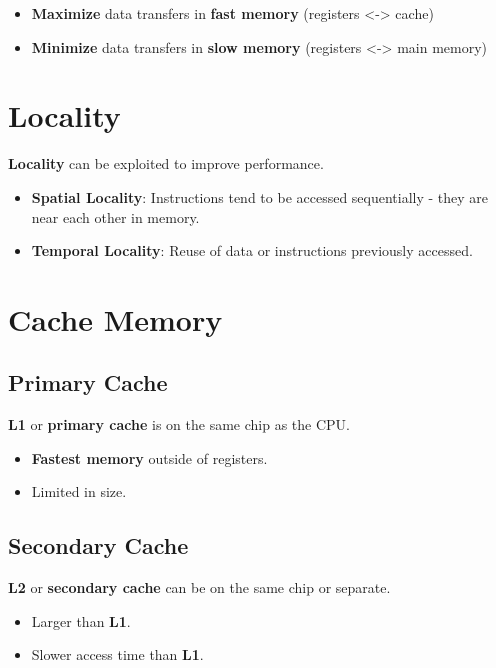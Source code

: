 \documentclass[12pt, letterpaper]{article}
\begin{document}
\begin{itemize}
  \item \textbf{Maximize} data transfers in \textbf{fast memory}
    (registers <-> cache)
  \item \textbf{Minimize} data transfers in \textbf{slow memory}
    (registers <-> main memory)
\end{itemize}

\section*{Locality}

\textbf{Locality} can be exploited to improve performance.

\begin{itemize}
  \item \textbf{Spatial Locality}: Instructions tend to be accessed
    sequentially - they are near each other in memory.
  \item \textbf{Temporal Locality}: Reuse of data or instructions
    previously accessed.
\end{itemize}

\section*{Cache Memory}

\subsection*{Primary Cache}

\textbf{L1} or \textbf{primary cache} is on the same chip as the CPU.

\begin{itemize}
  \item \textbf{Fastest memory} outside of registers.
  \item Limited in size.
\end{itemize}

\subsection*{Secondary Cache}

\textbf{L2} or \textbf{secondary cache} can be on the same chip or separate.

\begin{itemize}
  \item Larger than \textbf{L1}.
  \item Slower access time than \textbf{L1}.
\end{itemize}
\end{document}
